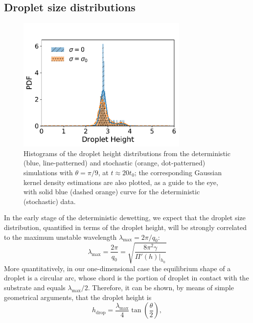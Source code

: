 \subsection{Droplet size distributions}\label{subsec:morphandrup}
\begin{figure}
    \centering
    \includegraphics[width=0.75\textwidth]{graphics/Droplet_height_['00', '1e-7']_distri_new_35_nodist.pdf}
    \caption{Histograms of the droplet height distributions from the deterministic (blue, line-patterned) and stochastic (orange, dot-patterned) simulations with $\theta = \pi/9$, at $t \approx 20 t_0$; the corresponding Gaussian kernel density estimations are also plotted, as a guide to the eye, with solid blue (dashed orange) curve for the deterministic (stochastic) data.}
    \label{fig:droplet_distribution}
\end{figure}
In the early stage of the deterministic dewetting, we expect that the droplet size distribution, quantified in terms of the droplet height, will be strongly correlated to the maximum unstable wavelength $\lambda_{\text{max}} =2\pi/q_0$:
\begin{equation}\label{eq:lambda_max}
    \lambda_{\text{max}} = \frac{2\pi}{q_0} = \sqrt{\frac{8\pi^2\gamma}{\Pi'(h)|_{h_0}}} 
\end{equation}
More quantitatively, in our one-dimensional case the equilibrium shape of a droplet is a circular arc, whose chord is the portion of droplet in contact with the substrate and equals $\lambda_{\text{max}}/2$. Therefore, it can be shown, by means of simple geometrical arguments, that the droplet height is
\begin{equation}\label{eq:cap_height}
   h_{\text{drop}} = \frac{\lambda_{\text{max}}}{4}\tan\left(\frac{\theta}{2}\right), 
\end{equation}

